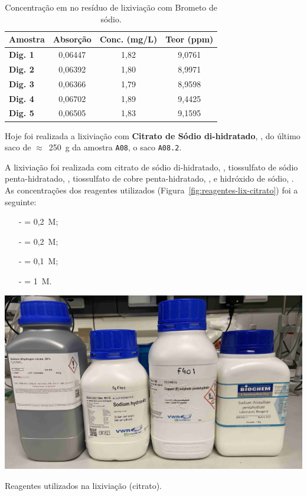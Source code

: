\begin{table}[!ht]
    \centering
    \begin{tabularx}{\textwidth}{@{}lCCC@{}}
        \toprule
        \textbf{Amostra} & \textbf{Absorção} & \textbf{Conc. (mg/L)} & \textbf{Teor  (ppm)} \\ \midrule
        \textbf{Dig. 1}  & 0,06447 & 1,82 & 9,0761 \\
        \textbf{Dig. 2}  & 0,06392 & 1,80 & 8,9971 \\
        \textbf{Dig. 3}  & 0,06366 & 1,79 & 8,9598\\
        \textbf{Dig. 4}  & 0,06702 & 1,89 & 9,4425 \\
        \textbf{Dig. 5}  & 0,06505 & 1,83 & 9,1595 \\
        \bottomrule
    \end{tabularx}
    \caption{Concentração em  no resíduo de lixiviação com Brometo de sódio.}
    \label{tab:aas-concentracao-au-res-bromo}
\end{table}

\hrulefill


\label{day:29-novembro-2024}

Hoje foi realizada a lixiviação com \textbf{Citrato de Sódio di-hidratado}, \citratodi{}, do último saco de $\approx$~250~g da amostra \texttt{A08}, o saco \texttt{A08.2}.

A lixiviação foi realizada com citrato de sódio di-hidratado, \citratodi{}, tiossulfato de sódio penta-hidratado, \tsp{}, tiossulfato de cobre penta-hidratado, \sulfcu{}, e hidróxido de sódio, \hidso{}.
As concentrações dos reagentes utilizados (Figura~\ref{fig:reagentes-lix-citrato}) foi a seguinte:
\begin{itemize}
    \item[-] \citratodi{} = 0,2~M;
    \item[-] \tsp{} = 0,2~M;
    \item[-] \sulfcu{} = 0,1~M;
    \item[-] \hidso{} = 1~M.
\end{itemize}

\begin{marginfigure}[-3cm]
    \centering
    \includegraphics[width=0.9\linewidth]{figures/reagentes lixiviação citrato}
    \caption{Reagentes utilizados na lixiviação (citrato).}
    \label{fig:reagentes-lix-citrato}
\end{marginfigure}

